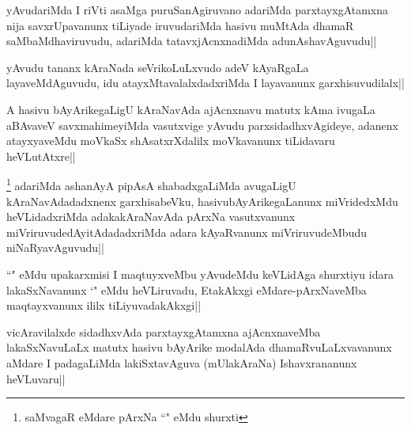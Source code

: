 \begin{artha}
yAvudariMda I riVti asaMga puruSanAgiruvano adariMda parxtayxgAtamxna nija savxrUpavanunx tiLiyade iruvudariMda hasivu muMtAda dhamaR saMbaMdhaviruvudu, adariMda tatavxjAcnxnadiMda adunAshavAguvudu||
\end{artha}


\begin{artha}
yAvudu tananx kAraNada seVrikoLuLxvudo adeV kAyaRgaLa layaveMdAguvudu, idu atayxMtavalalxdadxriMda I layavanunx garxhisuvudilalx||
\end{artha}


\begin{artha}
A hasivu bAyArikegaLigU kAraNavAda ajAcnxnavu matutx kAma ivugaLa aBAvaveV savxmahimeyiMda vasutxvige yAvudu parxsidadhxvAgideye, adanenx atayxyaveMdu moVkaSx shAsatxrXdalilx moVkavanunx tiLidavaru heVLutAtxre||
\end{artha}

\begin{artha}
\footnote[1]{saMvagaR eMdare pArxNa ``\stext " eMdu shurxti} adariMda ashanAyA pipAsA shabadxgaLiMda avugaLigU kAraNavAdadadxnenx garxhisabeVku, hasivubAyArikegaLanunx miVridedxMdu heVLidadxriMda adakakAraNavAda pArxNa vasutxvanunx miVriruvudedAyitAdadadxriMda adara kAyaRvanunx miVriruvudeMbudu niNaRyavAguvudu||
\end{artha}


\begin{artha}
``\stext " eMdu upakarxmisi I maqtuyxveMbu yAvudeMdu keVLidAga shurxtiyu idara lakaSxNavanunx `\stext " eMdu heVLiruvadu, EtakAkxgi eMdare-pArxNaveMba maqtayxvanunx ililx tiLiyuvadakAkxgi||
\end{artha}


\begin{artha}
vicAravilalxde sidadhxvAda parxtayxgAtamxna ajAcnxnaveMba lakaSxNavuLaLx matutx hasivu bAyArike modalAda dhamaRvuLaLxvavanunx aMdare I padagaLiMda lakiSxtavAguva (mUlakAraNa) Ishavxrananunx heVLuvaru||
\end{artha}

